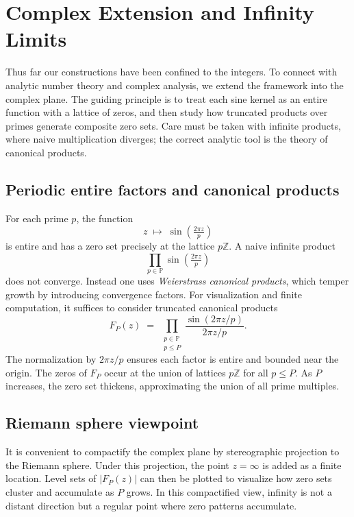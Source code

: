 \documentclass[12pt]{article}
\theoremstyle{definition}
\theoremstyle{remark}
\newcommand{\Z}{\mathbb{Z}}
\newcommand{\Primes}{\mathbb{P}}
\begin{document}
\section{Complex Extension and Infinity Limits}\label{sec:complex}

Thus far our constructions have been confined to the integers. To connect with analytic number theory and complex analysis, we extend the framework into the complex plane. The guiding principle is to treat each sine kernel as an entire function with a lattice of zeros, and then study how truncated products over primes generate composite zero sets. Care must be taken with infinite products, where naive multiplication diverges; the correct analytic tool is the theory of canonical products.

\subsection{Periodic entire factors and canonical products}

For each prime \(p\), the function
\[
z \;\mapsto\; \sin\!\left(\tfrac{2\pi z}{p}\right)
\]
is entire and has a zero set precisely at the lattice \(p\Z\). A naive infinite product
\[
\prod_{p\in\Primes} \sin\!\left(\tfrac{2\pi z}{p}\right)
\]
does not converge. Instead one uses \emph{Weierstrass canonical products}, which temper growth by introducing convergence factors. For visualization and finite computation, it suffices to consider truncated canonical products
\[
F_P(z) \;=\;\prod_{\substack{p\in\Primes\\ p\le P}}
\frac{\sin(2\pi z/p)}{2\pi z/p}.
\]
The normalization by \(2\pi z/p\) ensures each factor is entire and bounded near the origin. The zeros of \(F_P\) occur at the union of lattices \(p\Z\) for all \(p\le P\). As \(P\) increases, the zero set thickens, approximating the union of all prime multiples.

\subsection{Riemann sphere viewpoint}

It is convenient to compactify the complex plane by stereographic projection to the Riemann sphere. Under this projection, the point \(z=\infty\) is added as a finite location. Level sets of \(|F_P(z)|\) can then be plotted to visualize how zero sets cluster and accumulate as \(P\) grows. In this compactified view, infinity is not a distant direction but a regular point where zero patterns accumulate.
\end{document}
